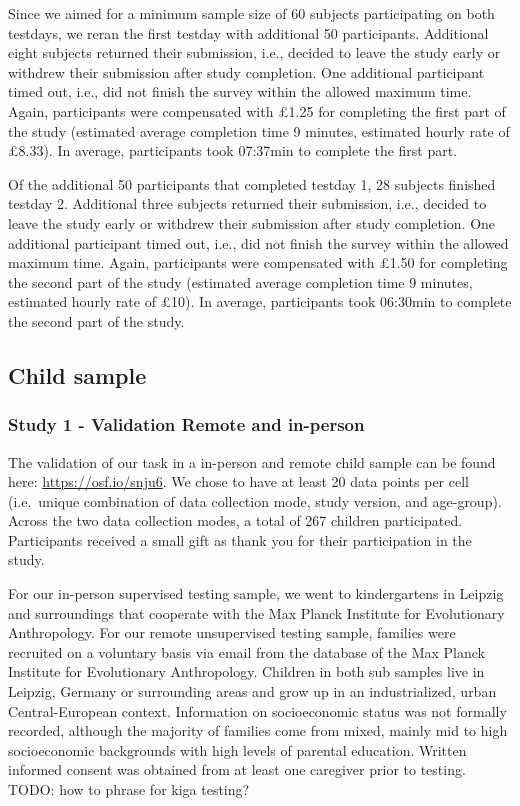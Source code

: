 \documentclass[
  english,
  man,floatsintext]{apa6}
\begin{document}
Since we aimed for a minimum sample size of 60 subjects participating on both testdays, we reran the first testday with additional 50 participants. Additional eight subjects returned their submission, i.e., decided to leave the study early or withdrew their submission after study completion. One additional participant timed out, i.e., did not finish the survey within the allowed maximum time. Again, participants were compensated with £1.25 for completing the first part of the study (estimated average completion time 9 minutes, estimated hourly rate of £8.33). In average, participants took 07:37min to complete the first part.

Of the additional 50 participants that completed testday 1, 28 subjects finished testday 2. Additional three subjects returned their submission, i.e., decided to leave the study early or withdrew their submission after study completion. One additional participant timed out, i.e., did not finish the survey within the allowed maximum time. Again, participants were compensated with £1.50 for completing the second part of the study (estimated average completion time 9 minutes, estimated hourly rate of £10). In average, participants took 06:30min to complete the second part of the study.

\hypertarget{child-sample}{%
\subsection{Child sample}\label{child-sample}}

\hypertarget{study-1---validation-remote-and-in-person}{%
\subsubsection{Study 1 - Validation Remote and in-person}\label{study-1---validation-remote-and-in-person}}

The validation of our task in a in-person and remote child sample can be found here: \url{https://osf.io/snju6}.
We chose to have at least 20 data points per cell (i.e.~unique combination of data collection mode, study version, and age-group). Across the two data collection modes, a total of 267 children participated. Participants received a small gift as thank you for their participation in the study.

For our in-person supervised testing sample, we went to kindergartens in Leipzig and surroundings that cooperate with the Max Planck Institute for Evolutionary Anthropology. For our remote unsupervised testing sample, families were recruited on a voluntary basis via email from the database of the Max Planck Institute for Evolutionary Anthropology. Children in both sub samples live in Leipzig, Germany or surrounding areas and grow up in an industrialized, urban Central-European context. Information on socioeconomic status was not formally recorded, although the majority of families come from mixed, mainly mid to high socioeconomic backgrounds with high levels of parental education.
Written informed consent was obtained from at least one caregiver prior to testing.
TODO: how to phrase for kiga testing?
\end{document}
